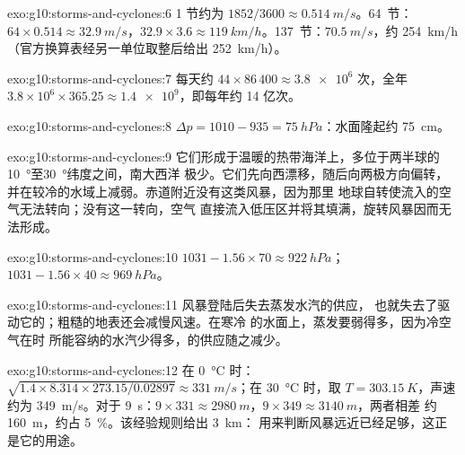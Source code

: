 \begin{solution}{exo:g10:storms-and-cyclones:6}
1 节约为 $1852/3600 \approx \qty{0.514}{m/s}$。\num{64}~节：$64 \times
0.514 \approx \qty{32.9}{m/s}$，$32.9 \times 3.6 \approx
\qty{119}{km/h}$。\num{137}~节：$\qty{70.5}{m/s}$，约
\qty{254}{km/h}（官方换算表经另一单位取整后给出
\qty{252}{km/h}）。
\end{solution}

\begin{solution}{exo:g10:storms-and-cyclones:7}
每天约 $44 \times 86\,400 \approx \num{3.8e6}$ 次，全年 $3.8\times10^6
\times 365.25 \approx \num{1.4e9}$，即每年约 14 亿次。
\end{solution}

\begin{solution}{exo:g10:storms-and-cyclones:8}
$\Delta p = 1010 - 935 = \qty{75}{hPa}$：水面隆起约 \qty{75}{cm}。
\end{solution}

\begin{solution}{exo:g10:storms-and-cyclones:9}
它们形成于温暖的热带海洋上，多位于两半球的
\qty{10}{\degree}至\qty{30}{\degree}纬度之间，南大西洋
极少。它们先向西漂移，随后向两极方向偏转，
并在较冷的水域上减弱。赤道附近没有这类风暴，因为那里
地球自转使流入的空气无法转向；没有这一转向，空气
直接流入低压区并将其填满，旋转风暴因而无法形成。
\end{solution}

\begin{solution}{exo:g10:storms-and-cyclones:10}
$1031 - 1.56 \times 70 \approx \qty{922}{hPa}$；$1031 - 1.56 \times 40
\approx \qty{969}{hPa}$。
\end{solution}

\begin{solution}{exo:g10:storms-and-cyclones:11}
风暴登陆后失去蒸发水汽的供应，
也就失去了驱动它的；粗糙的地表还会减慢风速。在寒冷
的水面上，蒸发要弱得多，因为冷空气在时
所能容纳的水汽少得多，的供应随之减少。
\end{solution}

\begin{solution}{exo:g10:storms-and-cyclones:12}
在 \qty{0}{\degreeCelsius} 时：$\sqrt{1.4 \times 8.314 \times 273.15/0.02897}
\approx \qty{331}{m/s}$；在 \qty{30}{\degreeCelsius} 时，取 $T =
\qty{303.15}{K}$，声速约为 \qty{349}{m/s}。对于 \qty{9}{s}：$9 \times 331 \approx
\qty{2980}{m}$，$9 \times 349 \approx \qty{3140}{m}$，两者相差
约 \qty{160}{m}，约占 \qty{5}{\percent}。该经验规则给出 \qty{3}{km}：
用来判断风暴远近已经足够，这正是它的用途。
\end{solution}

